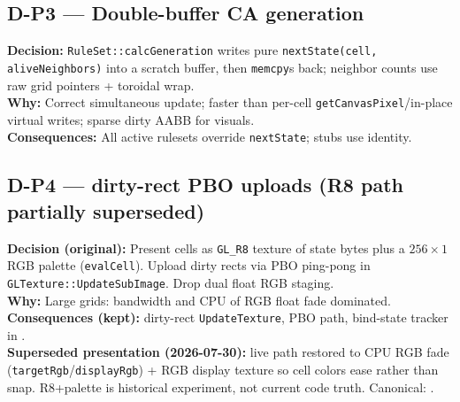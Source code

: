 \subsection*{D-P3 --- Double-buffer CA generation}
\begin{decisionbox}[title={D-P3 \quad 2026-07-28}]
\textbf{Decision:} \texttt{RuleSet::calcGeneration} writes pure
\texttt{nextState(cell, aliveNeighbors)} into a scratch buffer, then
\texttt{memcpy}s back; neighbor counts use raw grid pointers + toroidal wrap.\\
\textbf{Why:} Correct simultaneous update; faster than per-cell
\texttt{getCanvasPixel}/in-place virtual writes; sparse dirty AABB for visuals.\\
\textbf{Consequences:} All active rulesets override \texttt{nextState}; stubs
use identity.
\end{decisionbox}

\subsection*{D-P4 --- dirty-rect PBO uploads (R8 path partially superseded)}
\begin{decisionbox}[title={D-P4 \quad 2026-07-28}]
\textbf{Decision (original):} Present cells as \texttt{GL\_R8} texture of state
bytes plus a $256\times 1$ RGB palette (\texttt{evalCell}). Upload dirty rects
via PBO ping-pong in \texttt{GLTexture::UpdateSubImage}. Drop dual float RGB
staging.\\
\textbf{Why:} Large grids: bandwidth and CPU of RGB float fade dominated.\\
\textbf{Consequences (kept):} dirty-rect \texttt{UpdateTexture}, PBO path,
bind-state tracker in .\\
\textbf{Superseded presentation (2026-07-30):} live path restored to CPU RGB
fade (\texttt{targetRgb}/\texttt{displayRgb}) + RGB display texture so cell
colors ease rather than snap. R8+palette is historical experiment, not current
code truth. Canonical: .
\end{decisionbox}

